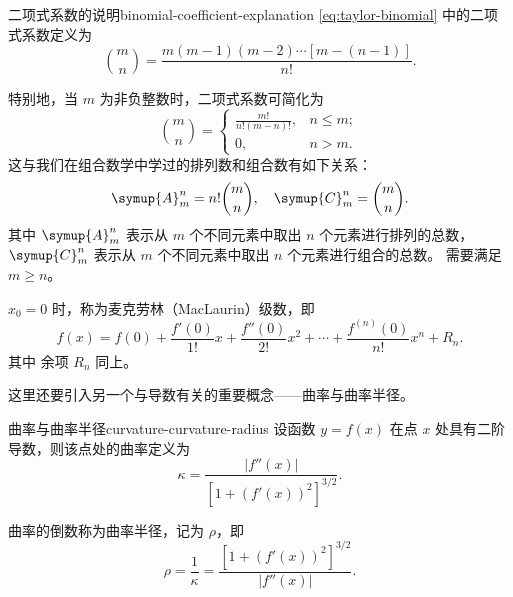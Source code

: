 \begin{note}{二项式系数的说明}{binomial-coefficient-explanation}
    \cref{eq:taylor-binomial} 中的二项式系数定义为
    \begin{equation*}
        \binom{m}{n} = \frac{m (m - 1) (m - 2) \cdots [m - (n - 1)]}{n!} .
    \end{equation*}

    特别地，当 $ m $ 为非负整数时，二项式系数可简化为
    \begin{equation*}
        \binom{m}{n} =
        \begin{cases}
            \frac{m!}{n! (m - n)!}, & n \leq m ; \\
            0,                      & n > m .
        \end{cases}
    \end{equation*}
    这与我们在组合数学中学过的排列数和组合数有如下关系：
    \begin{equation*}
        \symup{A}_m^n = n! \binom{m}{n},\quad \symup{C}_m^n = \binom{m}{n} .
    \end{equation*}
    其中 $ \symup{A}_m^n $ 表示从 $ m $ 个不同元素中取出 $ n $ 个元素进行排列的总数，$ \symup{C}_m^n $ 表示从 $ m $ 个不同元素中取出 $ n $ 个元素进行组合的总数。
    需要满足 $ m \geq n $。
\end{note}

$ x_0 = 0 $ 时，称为麦克劳林（MacLaurin）级数，即
\begin{equation*}
    f(x) = f(0) + \frac{f'(0)}{1!} x + \frac{f''(0)}{2!} x^2 + \cdots + \frac{f^{(n)}(0)}{n!} x^n + R_n.
\end{equation*}
其中 余项 $ R_n $ 同上。

\bigskip

这里还要引入另一个与导数有关的重要概念——曲率与曲率半径。
\begin{definition}{曲率与曲率半径}{curvature-curvature-radius}
    设函数 $ y = f(x) $ 在点 $ x $ 处具有二阶导数，则该点处的曲率定义为
    \begin{equation}
        \kappa = \frac{|f''(x)|}{[1 + (f'(x))^2]^{3/2}}.
    \end{equation}

    曲率的倒数称为曲率半径，记为 $ \rho $，即
    \begin{equation}
        \rho = \frac{1}{\kappa} = \frac{[1 + (f'(x))^2]^{3/2}}{|f''(x)|}.
    \end{equation}

\end{definition}

